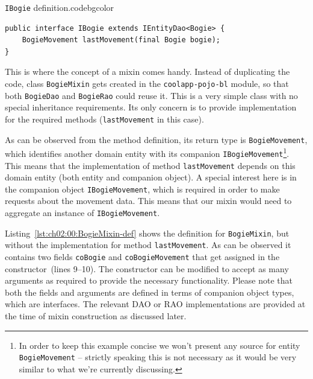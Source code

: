   \begin{code}{\texttt{IBogie} definition.}{\label{lst:ch02:00:IBogie}}{codebgcolor}
    \begin{lstlisting}
public interface IBogie extends IEntityDao<Bogie> {
    BogieMovement lastMovement(final Bogie bogie);
}
    \end{lstlisting}
  \end{code}
  
  This is where the concept of a mixin comes handy.
  Instead of duplicating the code, class \texttt{BogieMixin} gets created in the \texttt{coolapp-pojo-bl} module, so that both  \texttt{BogieDao} and \texttt{BogieRao} could reuse it.
  This is a very simple class with no special inheritance requirements.
  Its only concern is to provide implementation for the required methods (\texttt{lastMovement} in this case).
  
  As can be observed from the method definition, its return type is \texttt{BogieMovement}, which identifies another domain entity with its companion \texttt{IBogieMovement}\footnote{In order to keep this example concise we won't present any source for entity \texttt{BogieMovement} -- strictly speaking this is not necessary as it would be very similar to what we're currently discussing.}.
  This means that the implementation of method \texttt{lastMovement} depends on this domain entity (both entity and companion object).
  A special interest here is in the companion object \texttt{IBogieMovement}, which is required in order to make requests about the movement data.
  This means that our mixin would need to aggregate an instance of \texttt{IBogieMovement}.
  
  Listing~\ref{lst:ch02:00:BogieMixin-def} shows the definition for \texttt{BogieMixin}, but without the implementation for method \texttt{lastMovement}.
  As can be observed it contains two fields \texttt{coBogie} and \texttt{coBogieMovement} that get assigned in the constructor~(lines 9--10).
  The constructor can be modified to accept as many arguments as required to provide the necessary functionality.
  Please note that both the fields and arguments are defined in terms of companion object types, which are interfaces.
  The relevant DAO or RAO implementations are provided at the time of mixin construction as discussed later.
  
